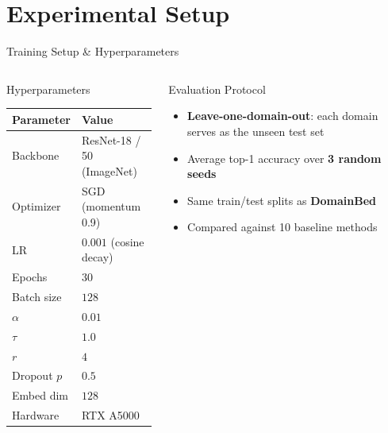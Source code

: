 \documentclass[aspectratio=169,10pt]{beamer}
\begin{document}
\section{Experimental Setup}

\begin{frame}{Training Setup \& Hyperparameters}
  \begin{columns}[T]
      \begin{block}{Hyperparameters}
        \small
        \begin{tabular}{@{}ll@{}}
          \toprule
          \textbf{Parameter} & \textbf{Value} \\
          \midrule
          Backbone     & ResNet-18 / 50 (ImageNet) \\
          Optimizer    & SGD (momentum 0.9) \\
          LR           & $0.001$ (cosine decay) \\
          Epochs       & $30$ \\
          Batch size   & $128$ \\
          $\alpha$     & $0.01$ \\
          $\tau$       & $1.0$ \\
          $r$          & $4$ \\
          Dropout $p$  & $0.5$ \\
          Embed dim    & $128$ \\
          Hardware     & RTX A5000 \\
          \bottomrule
        \end{tabular}
      \end{block}

      \begin{block}{Evaluation Protocol}
        \begin{itemize}
          \item \textbf{Leave-one-domain-out}: each domain serves as the unseen test set
          \item Average top-1 accuracy over \textbf{3 random seeds}
          \item Same train/test splits as \textbf{DomainBed}
          \item Compared against 10 baseline methods
        \end{itemize}
      \end{block}


\end{columns}
\end{frame}
\end{document}
